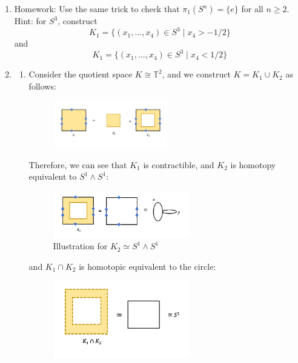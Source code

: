 \begin{example}
\begin{enumerate}
\item
Homework:
Use the same trick to check that $\pi_1(S^n) = \{e\}$ for all $n\ge 2$.
Hint: for $S^3$, construct
\[
K_1=\{(x_1,\dots,x_4)\in S^3\mid x_4>-1/2\}
\]
and
\[
K_1=\{(x_1,\dots,x_4)\in S^3\mid x_4<1/2\}
\]
\item
\begin{enumerate}
\item
Consider the quotient space $K\cong\mathbb{T}^2$, and we construct $K=K_1\cup K_2$ as follows:
\begin{figure}[H]
\centering
\includegraphics[width=0.5\textwidth]{week15/f_48}
\end{figure}

Therefore, we can see that $K_1$ is contractible, and $K_2$ is homotopy equivalent to $S^1\wedge S^1$:
\begin{figure}[H]
\centering
\includegraphics[width=0.6\textwidth]{week15/f_50}
\caption{Illustration for $K_2\simeq S^1\wedge S^1$}
\end{figure}
and $K_1\cap K_2$ is homotopic equivalent to the circle:
\begin{figure}[H]
\centering
\includegraphics[width=0.6\textwidth]{week15/f_51}
\end{figure}


\end{enumerate}
\end{enumerate}
\end{example}
